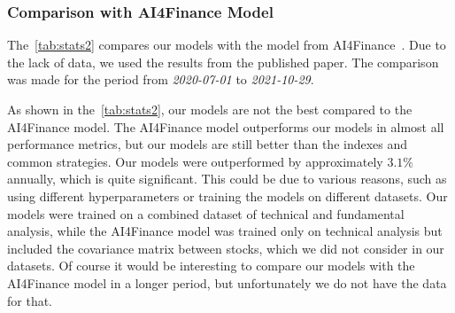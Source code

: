 \documentclass[../xlapes02]{subfiles}
\begin{document}
    \subsubsection{Comparison with AI4Finance Model}\label{subsec:AI4finance-model}
    The~\cref{tab:stats2} compares our models with the model from AI4Finance~\cite{finrl-portfolio-allocation-2020}. Due to the lack of data, we used the results from the published paper. The comparison was made for the period from \emph{2020-07-01} to \emph{2021-10-29}.

    As shown in the~\cref{tab:stats2}, our models are not the best compared to the AI4Finance model. The AI4Finance model outperforms our models in almost all performance metrics, but our models are still better than the indexes and common strategies. Our models were outperformed by approximately $3.1\%$ annually, which is quite significant. This could be due to various reasons, such as using different hyperparameters or training the models on different datasets. Our models were trained on a combined dataset of technical and fundamental analysis, while the AI4Finance model was trained only on technical analysis but included the covariance matrix between stocks, which we did not consider in our datasets. Of course it would be interesting to compare our models with the AI4Finance model in a longer period, but unfortunately we do not have the data for that.
\end{document}

